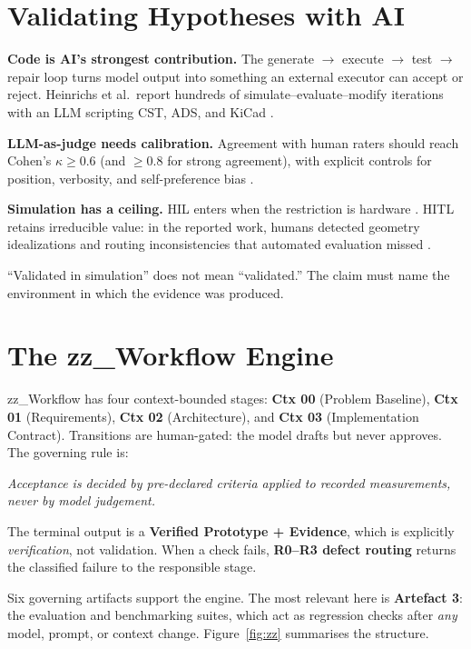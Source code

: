 \documentclass[11pt,a4paper]{article}
\begin{document}
\section{Validating Hypotheses with AI}

\textbf{Code is AI's strongest contribution.} The generate $\to$ execute $\to$ test
$\to$ repair loop turns model output into something an external executor can accept or
reject. Heinrichs et al.\ report hundreds of simulate--evaluate--modify iterations with an
LLM scripting CST, ADS, and KiCad \cite{heinrichs2026}.

\textbf{LLM-as-judge needs calibration.} Agreement with human raters should reach
Cohen's $\kappa \ge 0.6$ (and $\ge 0.8$ for strong agreement), with explicit controls
for position, verbosity, and self-preference bias \cite{futureagi2026,judge2026}.

\textbf{Simulation has a ceiling.} HIL enters when the restriction is hardware
\cite{opalrt2026}. HITL retains irreducible value: in the reported work, humans
detected geometry idealizations and routing inconsistencies that automated evaluation
missed \cite{bajestani2026,heinrichs2026}.

\begin{notebox}
``Validated in simulation'' does not mean ``validated.'' The claim must name the
environment in which the evidence was produced.
\end{notebox}

\section{The zz\_Workflow Engine}

zz\_Workflow has four context-bounded stages: \textbf{Ctx 00} (Problem Baseline),
\textbf{Ctx 01} (Requirements), \textbf{Ctx 02} (Architecture), and \textbf{Ctx 03}
(Implementation Contract). Transitions are human-gated: the model drafts but never
approves. The governing rule is:

\begin{notebox}
\emph{Acceptance is decided by pre-declared criteria applied to recorded
measurements, never by model judgement.}
\end{notebox}

The terminal output is a \textbf{Verified Prototype + Evidence}, which is explicitly
\emph{verification}, not validation. When a check fails, \textbf{R0--R3 defect routing}
returns the classified failure to the responsible stage.

Six governing artifacts support the engine. The most relevant here is \textbf{Artefact 3}:
the evaluation and benchmarking suites, which act as regression checks after \emph{any}
model, prompt, or context change. Figure~\ref{fig:zz} summarises the structure.
\end{document}

